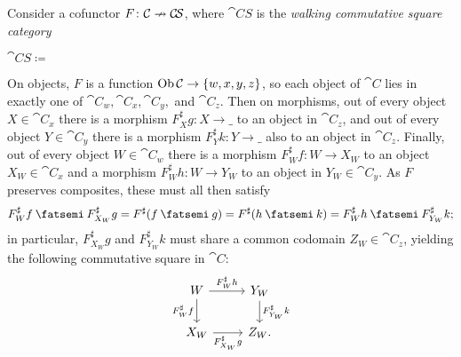 \documentclass[Book-Poly]{subfiles}
\begin{document}
\begin{example} \label{ex.cof_to_comm_sq}
Consider a cofunctor $F\colon\mathcal{C}\nrightarrow\mathcal{C\!S}$, where $\cat{C\!S}$ is the \emph{walking commutative square category}
\begin{center}
    $\cat{C\!S}\coloneqq\:$
\end{center}
On objects, $F$ is a function $\operatorname{Ob}\mathcal{C}\to\{w,x,y,z\}$, so each object of $\cat{C}$ lies in exactly one of $\cat{C}_w,\cat{C}_x,\cat{C}_y,$ and $\cat{C}_z$.
Then on morphisms, out of every object $X\in\cat{C}_x$ there is a morphism $F^\sharp_Xg\colon X\to\_$ to an object in $\cat{C}_z$, and out of every object $Y\in\cat{C}_y$ there is a morphism $F^\sharp_Yk\colon Y\to\_$ also to an object in $\cat{C}_z$.
Finally, out of every object $W\in\cat{C}_w$ there is a morphism $F^\sharp_Wf\colon W\to X_W$ to an object $X_W\in\cat{C}_x$ and a morphism $F^\sharp_Wh\colon W\to Y_W$ to an object in $Y_W\in\cat{C}_y$.
As $F$ preserves composites, these must all then satisfy
\[
    F^\sharp_Wf\then F^\sharp_{X_W}g=F^\sharp(f\then g)=F^\sharp(h\then k)=F^\sharp_Wh\then F^\sharp_{Y_W}k;
\]
in particular, $F^\sharp_{X_W}g$ and $F^\sharp_{Y_W}k$ must share a common codomain $Z_W\in\cat{C}_z$, yielding the following commutative square in $\cat{C}$:
\[
\begin{tikzcd}[ampersand replacement=\&]
    W\ar[d,"F^\sharp_Wf"']\ar[r,"F^\sharp_Wh"] \& Y_W\ar[d,"F^\sharp_{Y_W}k"] \\
    X_W\ar[r,"F^\sharp_{X_W}g"'] \& Z_W.
\end{tikzcd}
\]
\end{example}
\end{document}
